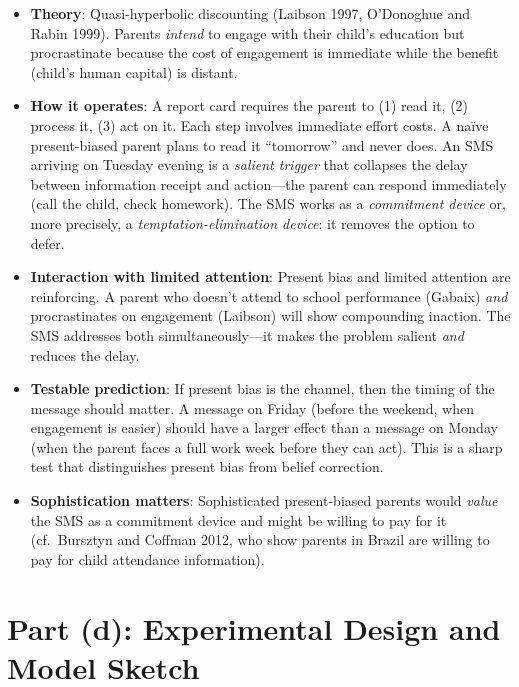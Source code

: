 \documentclass[11pt]{article}
\begin{document}
\begin{itemize}
  \item \textbf{Theory}: Quasi-hyperbolic discounting (Laibson 1997, O'Donoghue and Rabin 1999). Parents \emph{intend} to engage with their child's education but procrastinate because the cost of engagement is immediate while the benefit (child's human capital) is distant.
  \item \textbf{How it operates}: A report card requires the parent to (1) read it, (2) process it, (3) act on it. Each step involves immediate effort costs. A na\"{i}ve present-biased parent plans to read it ``tomorrow'' and never does. An SMS arriving on Tuesday evening is a \emph{salient trigger} that collapses the delay between information receipt and action---the parent can respond immediately (call the child, check homework). The SMS works as a \emph{commitment device} or, more precisely, a \emph{temptation-elimination device}: it removes the option to defer.
  \item \textbf{Interaction with limited attention}: Present bias and limited attention are reinforcing. A parent who doesn't attend to school performance (Gabaix) \emph{and} procrastinates on engagement (Laibson) will show compounding inaction. The SMS addresses both simultaneously---it makes the problem salient \emph{and} reduces the delay.
  \item \textbf{Testable prediction}: If present bias is the channel, then the timing of the message should matter. A message on Friday (before the weekend, when engagement is easier) should have a larger effect than a message on Monday (when the parent faces a full work week before they can act). This is a sharp test that distinguishes present bias from belief correction.
  \item \textbf{Sophistication matters}: Sophisticated present-biased parents would \emph{value} the SMS as a commitment device and might be willing to pay for it (cf.\ Bursztyn and Coffman 2012, who show parents in Brazil are willing to pay for child attendance information).
\end{itemize}

\section{Part (d): Experimental Design and Model Sketch}
\end{document}
